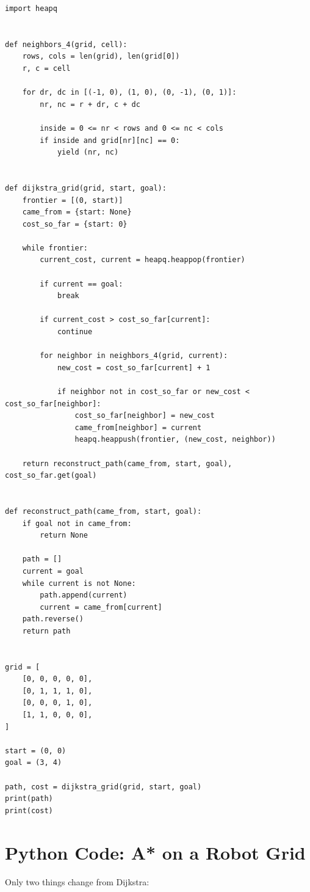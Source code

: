 \documentclass[11pt,a4paper]{article}
\begin{document}
\begin{lstlisting}[style=pythonstyle]
import heapq


def neighbors_4(grid, cell):
    rows, cols = len(grid), len(grid[0])
    r, c = cell

    for dr, dc in [(-1, 0), (1, 0), (0, -1), (0, 1)]:
        nr, nc = r + dr, c + dc

        inside = 0 <= nr < rows and 0 <= nc < cols
        if inside and grid[nr][nc] == 0:
            yield (nr, nc)


def dijkstra_grid(grid, start, goal):
    frontier = [(0, start)]
    came_from = {start: None}
    cost_so_far = {start: 0}

    while frontier:
        current_cost, current = heapq.heappop(frontier)

        if current == goal:
            break

        if current_cost > cost_so_far[current]:
            continue

        for neighbor in neighbors_4(grid, current):
            new_cost = cost_so_far[current] + 1

            if neighbor not in cost_so_far or new_cost < cost_so_far[neighbor]:
                cost_so_far[neighbor] = new_cost
                came_from[neighbor] = current
                heapq.heappush(frontier, (new_cost, neighbor))

    return reconstruct_path(came_from, start, goal), cost_so_far.get(goal)


def reconstruct_path(came_from, start, goal):
    if goal not in came_from:
        return None

    path = []
    current = goal
    while current is not None:
        path.append(current)
        current = came_from[current]
    path.reverse()
    return path


grid = [
    [0, 0, 0, 0, 0],
    [0, 1, 1, 1, 0],
    [0, 0, 0, 1, 0],
    [1, 1, 0, 0, 0],
]

start = (0, 0)
goal = (3, 4)

path, cost = dijkstra_grid(grid, start, goal)
print(path)
print(cost)
\end{lstlisting}

\section{Python Code: A* on a Robot Grid}

Only two things change from Dijkstra:
\end{document}

